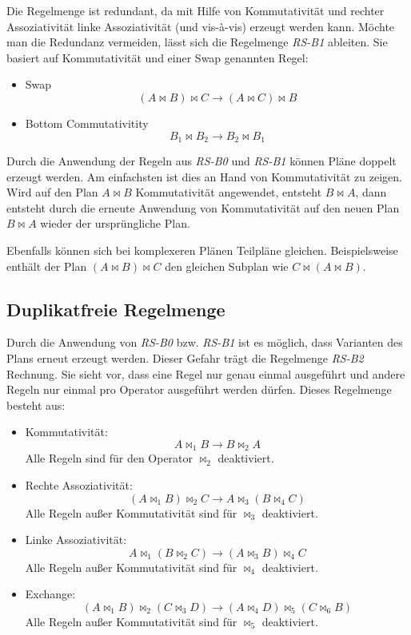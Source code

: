 Die Regelmenge ist redundant, da mit Hilfe von Kommutativität und rechter Assoziativität linke Assoziativität (und vis-à-vis) erzeugt werden kann. Möchte man die Redundanz vermeiden, lässt sich die Regelmenge \textit{RS-B1} ableiten. Sie basiert auf Kommutativität und einer Swap genannten Regel:

\begin{itemize}
\item Swap $$ (A \Join B) \Join C \to (A \Join C) \Join B $$
\item Bottom Commutativitity $$ B_1 \Join B_2 \to B_2 \Join B_1$$
\end{itemize}



Durch die Anwendung der Regeln aus \textit{RS-B0} und \textit{RS-B1} können Pläne doppelt erzeugt werden. Am einfachsten ist dies an Hand von Kommutativität zu zeigen. Wird auf den Plan $A \Join B$ Kommutativität angewendet, entsteht $B \Join A$, dann entsteht durch  die erneute Anwendung von Kommutativität auf den neuen Plan $B \Join A$ wieder der ursprüngliche Plan.

Ebenfalls können sich bei komplexeren Plänen  Teilpläne gleichen. Beispielsweise enthält der Plan $(A \Join B) \Join C$ den gleichen Subplan wie $C \Join (A \Join B)$.



\subsection{Duplikatfreie Regelmenge}
Durch die Anwendung von \textit{RS-B0} bzw. \textit{RS-B1} ist es möglich, dass Varianten des Plans erneut erzeugt werden. Dieser Gefahr trägt die Regelmenge \textit{RS-B2} Rechnung. Sie sieht vor, dass eine Regel nur genau einmal ausgeführt und andere Regeln nur einmal pro Operator ausgeführt werden dürfen. Dieses Regelmenge besteht aus:


\begin{itemize}
\item Kommutativität: $$ A \Join_1 B \to B \Join_2 A$$
Alle Regeln sind für den Operator $\Join_2$ deaktiviert.
\item Rechte Assoziativität: $$(A \Join_1 B) \Join_2 C \to A \Join_3 (B \Join_4 C) $$
Alle Regeln außer Kommutativität sind für $\Join_3$ deaktiviert.
\item Linke Assoziativität: $$A \Join_1 (B \Join_2 C) \to (A \Join_3 B) \Join_4 C$$
Alle Regeln außer Kommutativität sind für $\Join_4$ deaktiviert.

\item Exchange: $$(A \Join_1 B) \Join_2 (C \Join_3 D) \to (A \Join_4 D) \Join_5 (C \Join_6 B) $$
Alle Regeln außer Kommutativität sind für $\Join_5$ deaktiviert.
\end{itemize}

